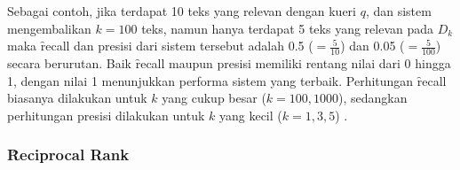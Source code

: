         Sebagai contoh, jika terdapat 10 teks yang relevan dengan kueri $q$, dan sistem mengembalikan $k=100$ teks, namun hanya terdapat 5 teks yang relevan pada $D_k$  maka \f{recall} dan presisi dari sistem tersebut adalah 0.5 ($=\frac{5}{10}$) dan 0.05 ($=\frac{5}{100}$) secara berurutan. Baik \f{recall} maupun presisi memiliki rentang nilai dari 0 hingga 1, dengan nilai 1 menunjukkan performa sistem yang terbaik. Perhitungan \f{recall} biasanya dilakukan untuk $k$ yang cukup besar ($k = 100,1000 $), sedangkan perhitungan presisi dilakukan untuk $k$ yang kecil ($k = 1, 3, 5$) \citep{irlecture}.


        \subsubsection{\f{Reciprocal Rank}}

